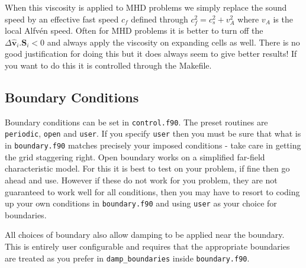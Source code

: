 \documentclass[11pt]{article}
\begin{document}
When this viscosity is applied to MHD problems we simply replace the sound speed by an effective fast speed $c_f$
defined through $c_f^2=c_s^2 + v_A^2$ where $v_A$ is the local Alfv\'en speed. Often for MHD problems it is
better to turn off the $\Delta \hat{\mathbf{v}}_i . \mathbf{S}_i<0$ and always apply the viscosity on expanding
cells as well. There is no good justification for doing this but it does always seem to give better results!
If you want to do this it is controlled through the Makefile.

\subsection{Boundary Conditions}
Boundary conditions can be set in {\tt control.f90}. The preset routines are {\tt periodic}, 
{\tt open} and {\tt user}. If you specify {\tt user} then you must be sure that what is in {\tt boundary.f90} matches 
precisely your imposed conditions - take care in getting the grid staggering right. Open boundary works on a 
simplified far-field characteristic model. For this it is best to test on your problem, if fine then go ahead 
and use. However if these do not work for you problem, they are not guaranteed to work well for all conditions, 
then you may have to resort to coding up your own conditions in {\tt boundary.f90} and using {\tt user} as your choice for boundaries.

All choices of boundary also allow damping to be applied near the boundary. This is entirely user configurable and 
requires that the appropriate boundaries are treated as you prefer in {\tt damp\_boundaries} inside {\tt boundary.f90}.
\end{document}
